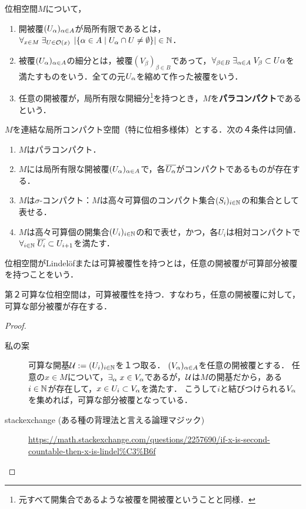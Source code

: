 \documentclass[uplatex,dvipdfmx]{jsreport}
\begin{document}
\begin{definition}[paracompact]
    位相空間$M$について，
    \begin{enumerate}
        \item 開被覆$(U_\alpha)_{\alpha\in A}$が局所有限であるとは，$\forall_{x\in M}\;\exists_{U\in\mathcal{O}(x)}\;\left|\left\{\alpha\in A\mid U_\alpha\cap U\ne\emptyset\right\}\right|\in\mathbb{N}$．
        \item 被覆$(U_\alpha)_{\alpha\in A}$の細分とは，被覆$(V_\beta)_{\beta\in B}$であって，$\forall_{\beta\in B}\;\exists_{\alpha\in A}\;V_\beta\subset U\alpha$を満たすものをいう．全ての元$U_\alpha$を縮めて作った被覆をいう．
        \item 任意の開被覆が，局所有限な開細分\footnote{元すべて開集合であるような被覆を開被覆ということと同様．}を持つとき，$M$を\textbf{パラコンパクト}であるという．
    \end{enumerate}
\end{definition}

\begin{theorem}[局所コンパクト空間のパラコンパクト性の特徴付け]
    $M$を連結な局所コンパクト空間（特に位相多様体）とする．次の４条件は同値．
    \begin{enumerate}
        \item $M$はパラコンパクト．
        \item $M$には局所有限な開被覆$(U_\alpha)_{\alpha\in A}$で，各$\overline{U_\alpha}$がコンパクトであるものが存在する．
        \item $M$は$\sigma$-コンパクト：$M$は高々可算個のコンパクト集合$(S_i)_{i\in\mathbb{N}}$の和集合として表せる．
        \item $M$は高々可算個の開集合$(U_i)_{i\in\mathbb{N}}$の和で表せ，かつ，各$U_i$は相対コンパクトで$\forall_{i\in\mathbb{N}}\;\overline{U_i}\subset U_{i+1}$を満たす．
    \end{enumerate}
\end{theorem}

\begin{definition}[Lindelöf]
    位相空間がLindelöfまたは可算被覆性を持つとは，任意の開被覆が可算部分被覆を持つことをいう．
\end{definition}

\begin{lemma}
    第２可算な位相空間は，可算被覆性を持つ．すなわち，任意の開被覆に対して，可算な部分被覆が存在する．
\end{lemma}
\begin{proof}\mbox{}
    \begin{description}
        \item[私の案] 可算な開基$\mathcal{U}:=(U_i)_{i\in\mathbb{N}}$を１つ取る．
        $(V_\alpha)_{\alpha\in A}$を任意の開被覆とする．
        任意の$x\in M$について，$\exists_{\alpha}\;x\in V_\alpha$であるが，$\mathcal{U}$は$M$の開基だから，ある$i\in\mathbb{N}$が存在して，$x\in U_i\subset V_\alpha$を満たす．
        こうして$i$と結びつけられる$V_\alpha$を集めれば，可算な部分被覆となっている． 
        \item[stackexchange (ある種の背理法と言える論理マジック)] 
    \url{
        https://math.stackexchange.com/questions/2257690/if-x-is-second-countable-then-x-is-lindel%
    }
    \end{description}
\end{proof}
\end{document}
